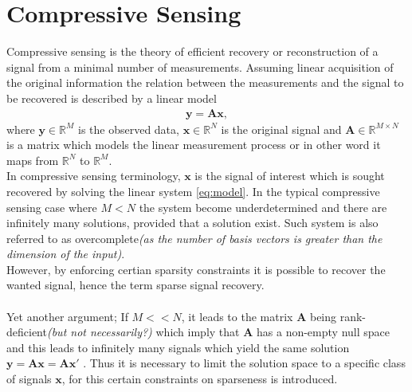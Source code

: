 \section{Compressive Sensing}\label{sec:CS}
Compressive sensing is the theory of efficient recovery or reconstruction of a signal from a minimal number of measurements. Assuming linear acquisition of the original information the relation between the measurements and the signal to be recovered is described by a linear model\cite{FR} 
\begin{align}\label{eq:model}
\mathbf{y} = \mathbf{Ax},
\end{align}
where $\mathbf{y} \in \mathbb{R}^M$ is the observed data, $\mathbf{x} \in \mathbb{R}^N$ is the original signal and $\mathbf{A} \in \mathbb{R}^{M \times N}$ is a matrix which models the linear measurement process or in other word it maps from $\mathbb{R}^{N}$ to $\mathbb{R}^{M}$.\\
In compressive sensing terminology, $\mathbf{x}$ is the signal of interest which is sought recovered by solving the linear system \eqref{eq:model}. In the typical compressive sensing case where $M<N$ the system become underdetermined and there are infinitely many solutions, provided that a solution exist. Such system is also referred to as overcomplete\textit{(as the number of basis vectors is greater than the dimension of the input)}.\\
However, by enforcing certian sparsity constraints it is possible to recover the wanted signal\cite{FR}, hence the term sparse signal recovery. \\ 
\\ 
Yet another argument; If $M<<N$, it leads to the matrix $\mathbf{A}$ being rank-deficient\textit{(but not necessarily?)} which imply that $\mathbf{A}$ has a non-empty null space and this leads to infinitely many signals which yield the same solution $\mathbf{y} = \mathbf{Ax} = \mathbf{Ax'}$ \cite[p. ix]{CS}. Thus it is necessary to limit the solution space to a specific class of signals $\mathbf{x}$, for this certain  constraints on sparseness is introduced.   
\\ \\

